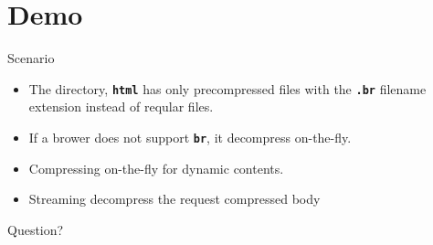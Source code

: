 \documentclass[11pt]{beamer}
\begin{document}
\section {Demo}

\begin{frame}{Scenario}
  \begin{itemize}
  \item The directory, \texttt{\textbf{html}} has only precompressed
    files with the
    \alert{\texttt{\textbf{.br}}} filename extension instead of reqular files.
  \item If a brower does not support \alert{\texttt{\textbf{br}}},
    it decompress on-the-fly.
  \item Compressing on-the-fly for dynamic contents.
  \item Streaming decompress the request compressed body
  \end{itemize}
\end{frame}

\begin{frame}[standout]
  Question?
\end{frame}
\end{document}
